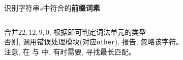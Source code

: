 \begin{frame}{}
  \begin{center}
    识别字符串$s$中符合的{\bf 前缀词素}
  \end{center}

  \begin{columns}
      \begin{center}
      \end{center}
      \begin{center}
      \end{center}
  \end{columns}

  \pause
  \vspace{0.30cm}
  \begin{center}
     合并$22, 12, 9, 0$, 根据即可判定词法单元的类型 \\[4pt]
    否则, 调用错误处理模块(对应\texttt{other}), 报告, 忽略该字符。 \\[4pt]
    注意, 在 \floatnum{} 与 \scinum{}中, 有时需要, 寻找最长匹配。
  \end{center}
\end{frame}
